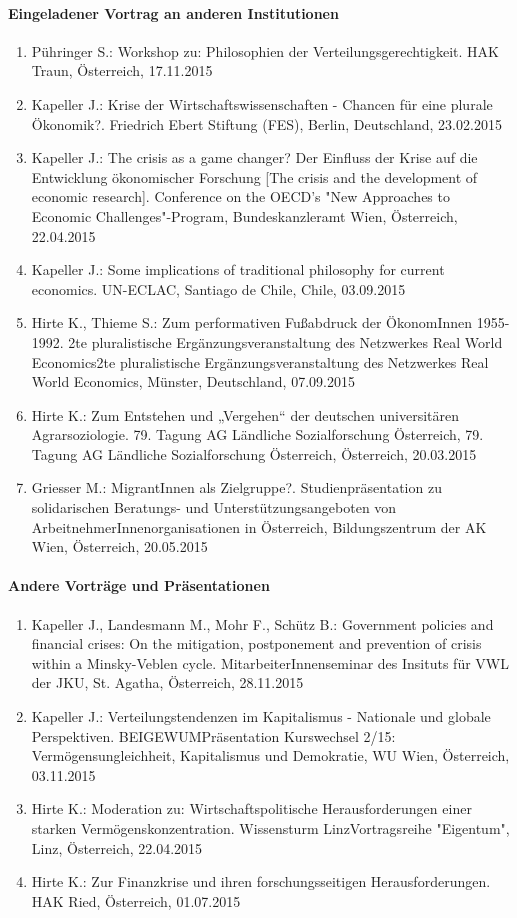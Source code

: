 \paragraph{Eingeladener Vortrag an anderen Institutionen}
\begin{enumerate}
	\item Pühringer S.: Workshop zu: Philosophien der Verteilungsgerechtigkeit. HAK Traun, Österreich, 17.11.2015
	\item Kapeller J.: Krise der Wirtschaftswissenschaften - Chancen für eine plurale Ökonomik?. Friedrich Ebert Stiftung (FES), Berlin, Deutschland, 23.02.2015
	\item Kapeller J.: The crisis as a game changer? Der Einfluss der Krise auf die Entwicklung ökonomischer Forschung [The crisis and the development of economic research]. Conference on the OECD's "New Approaches to Economic Challenges"-Program, Bundeskanzleramt Wien, Österreich, 22.04.2015
	\item Kapeller J.: Some implications of traditional philosophy for current economics. UN-ECLAC, Santiago de Chile, Chile, 03.09.2015
	\item Hirte K., Thieme S.: Zum performativen Fußabdruck der ÖkonomInnen 1955-1992. 2te pluralistische Ergänzungsveranstaltung des Netzwerkes Real World Economics2te pluralistische Ergänzungsveranstaltung des Netzwerkes Real World Economics, Münster, Deutschland, 07.09.2015
	\item Hirte K.: Zum Entstehen und „Vergehen“ der deutschen universitären Agrarsoziologie. 79. Tagung AG Ländliche Sozialforschung Österreich, 79. Tagung AG Ländliche Sozialforschung Österreich, Österreich, 20.03.2015
	\item Griesser M.: MigrantInnen als Zielgruppe?. Studienpräsentation zu solidarischen Beratungs- und Unterstützungsangeboten von ArbeitnehmerInnenorganisationen in Österreich, Bildungszentrum der AK Wien, Österreich, 20.05.2015
\end{enumerate}
\paragraph{Andere Vorträge und Präsentationen}
\begin{enumerate}
	\item Kapeller J., Landesmann M., Mohr F., Schütz B.: Government policies and financial crises: On the mitigation, postponement and prevention of crisis within a Minsky-Veblen cycle. MitarbeiterInnenseminar des Insituts für VWL der JKU, St. Agatha, Österreich, 28.11.2015
	\item Kapeller J.: Verteilungstendenzen im Kapitalismus - Nationale und globale Perspektiven. BEIGEWUMPräsentation Kurswechsel 2/15: Vermögensungleichheit, Kapitalismus und Demokratie, WU Wien, Österreich, 03.11.2015
	\item Hirte K.: Moderation zu: Wirtschaftspolitische Herausforderungen einer starken Vermögenskonzentration. Wissensturm LinzVortragsreihe "Eigentum", Linz, Österreich, 22.04.2015
	\item Hirte K.: Zur Finanzkrise und ihren forschungsseitigen Herausforderungen. HAK Ried, Österreich, 01.07.2015
\end{enumerate}
